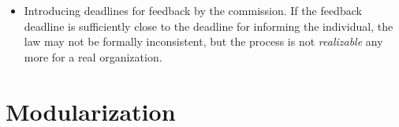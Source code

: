 \begin{itemize}
\item Introducing deadlines for feedback by the commission. If the feedback deadline is
  sufficiently close to the deadline for informing the individual, the law may
  not be formally inconsistent, but the process is not \emph{realizable} any
  more for a real organization. 
\end{itemize}

\section{Modularization}



